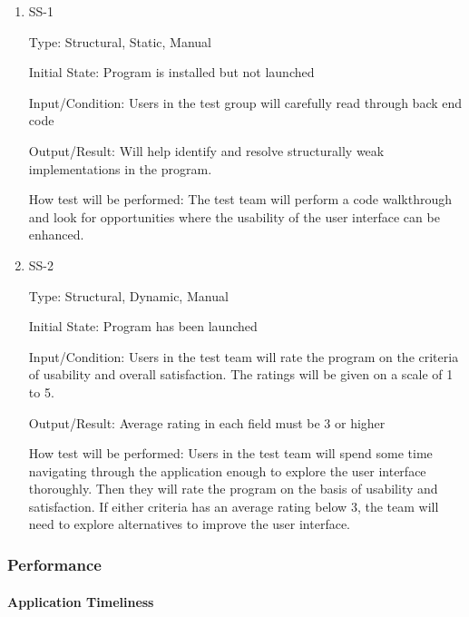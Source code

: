 \documentclass[12pt, titlepage]{article}
\begin{document}
\begin{enumerate}

\item{SS-1\\}

Type: Structural, Static, Manual
					
Initial State: Program is installed but not launched
					
Input/Condition: Users in the test group will carefully read through back end code
					
Output/Result: Will help identify and resolve structurally weak implementations in the program.
					
How test will be performed: The test team will perform a code walkthrough and look for opportunities where the usability of the user interface can be enhanced.
					
\item{SS-2\\}

Type: Structural, Dynamic, Manual
					
Initial State: Program has been launched 
					
Input/Condition: Users in the test team will rate the program on the criteria of usability and overall satisfaction. The ratings will be given on a scale of 1 to 5.
					
Output/Result: Average rating in each field must be 3 or higher
					
How test will be performed: Users in the test team will spend some time navigating through the application enough to explore the user interface thoroughly. Then they will rate the program on the basis of usability and satisfaction. If either criteria has an average rating below 3, the team will need to explore alternatives to improve the user interface.

\end{enumerate}

\subsubsection{Performance}

\paragraph{Application Timeliness}
\end{document}
